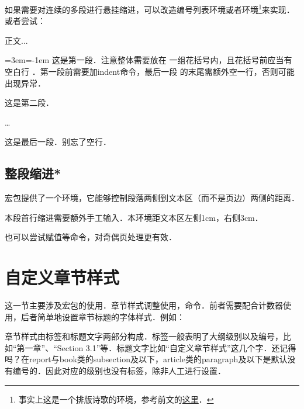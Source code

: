 如果需要对连续的多段进行悬挂缩进，可以改造编号列表环境或者环境\footnote{事实上这是一个排版诗歌的环境，参考前文的\hyperref[envi:verse]{这里}．}来实现．或者尝试：

\begin{codeshow}
正文...

{\leftskip=3em\parindent=-1em
\indent 这是第一段．注意整体需要放在
一组花括号内，且花括号前应当有空白行
．第一段前需要加indent命令，最后一段
的末尾需额外空一行，否则可能出现异常．

这是第二段．

\ldots

这是最后一段．别忘了空行．

}
\end{codeshow}

\subsection{整段缩进*}
宏包提供了一个环境，它能够控制段落两侧到文本区（而不是页边）两侧的距离．
\begin{latex}
\begin{adjustwidth}{1cm}{3cm}
本段首行缩进需要额外手工输入．本环境距文本区左侧1cm，右侧3cm．
\end{adjustwidth}
\end{latex}

也可以尝试赋值等命令，对奇偶页处理更有效．

\section{自定义章节样式}
\label{sec:titlesec}
这一节主要涉及宏包的使用．章节样式调整使用，命令．前者需要配合计数器使用，后者简单地设置章节标题的字体样式．例如：

章节样式由标签和标题文字两部分构成．标签一般表明了大纲级别以及编号，比如“第一章”、“Section 3.1”等．标题文字比如“自定义章节样式”这几个字．还记得吗？在report与book类的subsection及以下，article类的paragraph及以下是默认没有编号的．因此对应的级别也没有标签，除非人工进行设置．

